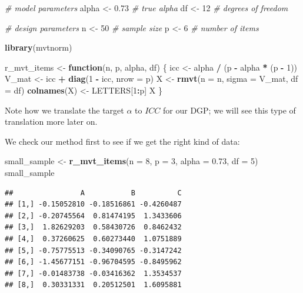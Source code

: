 \documentclass[
]{book}
\newenvironment{Shaded}{\begin{snugshade}}{\end{snugshade}}
\newcommand{\AttributeTok}[1]{\textcolor[rgb]{0.13,0.29,0.53}{#1}}
\newcommand{\CommentTok}[1]{\textcolor[rgb]{0.56,0.35,0.01}{\textit{#1}}}
\newcommand{\ControlFlowTok}[1]{\textcolor[rgb]{0.13,0.29,0.53}{\textbf{#1}}}
\newcommand{\DecValTok}[1]{\textcolor[rgb]{0.00,0.00,0.81}{#1}}
\newcommand{\FloatTok}[1]{\textcolor[rgb]{0.00,0.00,0.81}{#1}}
\newcommand{\FunctionTok}[1]{\textcolor[rgb]{0.13,0.29,0.53}{\textbf{#1}}}
\newcommand{\NormalTok}[1]{#1}
\newcommand{\OtherTok}[1]{\textcolor[rgb]{0.56,0.35,0.01}{#1}}
\newcommand{\SpecialCharTok}[1]{\textcolor[rgb]{0.81,0.36,0.00}{\textbf{#1}}}
\begin{document}
\begin{Shaded}
\begin{Highlighting}[]
\CommentTok{\# model parameters}
\NormalTok{alpha }\OtherTok{\textless{}{-}} \FloatTok{0.73} \CommentTok{\# true alpha}
\NormalTok{df }\OtherTok{\textless{}{-}} \DecValTok{12} \CommentTok{\# degrees of freedom}

\CommentTok{\# design parameters}
\NormalTok{n }\OtherTok{\textless{}{-}} \DecValTok{50} \CommentTok{\# sample size}
\NormalTok{p }\OtherTok{\textless{}{-}} \DecValTok{6} \CommentTok{\# number of items}


\FunctionTok{library}\NormalTok{(mvtnorm)}

\NormalTok{r\_mvt\_items }\OtherTok{\textless{}{-}} \ControlFlowTok{function}\NormalTok{(n, p, alpha, df) \{}
\NormalTok{  icc }\OtherTok{\textless{}{-}}\NormalTok{ alpha }\SpecialCharTok{/}\NormalTok{ (p }\SpecialCharTok{{-}}\NormalTok{ alpha }\SpecialCharTok{*}\NormalTok{ (p }\SpecialCharTok{{-}} \DecValTok{1}\NormalTok{))}
\NormalTok{  V\_mat }\OtherTok{\textless{}{-}}\NormalTok{ icc }\SpecialCharTok{+} \FunctionTok{diag}\NormalTok{(}\DecValTok{1} \SpecialCharTok{{-}}\NormalTok{ icc, }\AttributeTok{nrow =}\NormalTok{ p)}
\NormalTok{  X }\OtherTok{\textless{}{-}} \FunctionTok{rmvt}\NormalTok{(}\AttributeTok{n =}\NormalTok{ n, }\AttributeTok{sigma =}\NormalTok{ V\_mat, }\AttributeTok{df =}\NormalTok{ df)}
  \FunctionTok{colnames}\NormalTok{(X) }\OtherTok{\textless{}{-}}\NormalTok{ LETTERS[}\DecValTok{1}\SpecialCharTok{:}\NormalTok{p]}
\NormalTok{  X}
\NormalTok{\}}
\end{Highlighting}
\end{Shaded}

Note how we translate the target \(\alpha\) to \(ICC\) for our DGP; we will see this type of translation more later on.

We check our method first to see if we get the right kind of data:

\begin{Shaded}
\begin{Highlighting}[]
\NormalTok{small\_sample }\OtherTok{\textless{}{-}} \FunctionTok{r\_mvt\_items}\NormalTok{(}\AttributeTok{n =} \DecValTok{8}\NormalTok{, }\AttributeTok{p =} \DecValTok{3}\NormalTok{, }\AttributeTok{alpha =} \FloatTok{0.73}\NormalTok{, }\AttributeTok{df =} \DecValTok{5}\NormalTok{)}
\NormalTok{small\_sample}
\end{Highlighting}
\end{Shaded}

\begin{verbatim}
##                A           B          C
## [1,] -0.15052810 -0.18516861 -0.4260487
## [2,] -0.20745564  0.81474195  1.3433606
## [3,]  1.82629203  0.58430726  0.8462432
## [4,]  0.37260625  0.60273440  1.0751889
## [5,] -0.75775513 -0.34090765 -0.3147242
## [6,] -1.45677151 -0.96704595 -0.8495962
## [7,] -0.01483738 -0.03416362  1.3534537
## [8,]  0.30331331  0.20512501  1.6095881
\end{verbatim}
\end{document}
